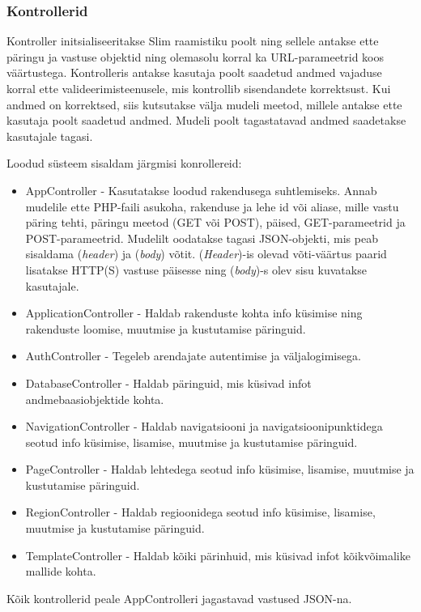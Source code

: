 \documentclass[a4paper,12pt]{article} %
\begin{document}
\subsubsection{Kontrollerid}
Kontroller initsialiseeritakse Slim raamistiku poolt ning sellele antakse ette päringu ja vastuse objektid ning olemasolu korral ka URL-parameetrid koos väärtustega. Kontrolleris antakse kasutaja poolt saadetud andmed vajaduse korral ette valideerimisteenusele, mis kontrollib sisendandete korrektsust. Kui andmed on korrektsed, siis kutsutakse välja mudeli meetod, millele antakse ette kasutaja poolt saadetud andmed. Mudeli poolt tagastatavad andmed saadetakse kasutajale tagasi.\par
Loodud süsteem sisaldam järgmisi konrollereid:
\begin{itemize}
\item AppController - Kasutatakse loodud rakendusega suhtlemiseks. Annab mudelile ette PHP-faili asukoha, rakenduse ja lehe id või aliase, mille vastu päring tehti, päringu meetod (GET või POST), päised, GET-parameetrid ja POST-parameetrid. Mudelilt oodatakse tagasi JSON-objekti, mis peab sisaldama (\textit{header}) ja (\textit{body}) võtit. (\textit{Header})-is olevad võti-väärtus paarid lisatakse HTTP(S) vastuse päisesse ning (\textit{body})-s olev sisu kuvatakse kasutajale.
\item ApplicationController - Haldab rakenduste kohta info küsimise ning rakenduste loomise, muutmise ja kustutamise päringuid.
\item AuthController - Tegeleb arendajate autentimise ja väljalogimisega.
\item DatabaseController - Haldab päringuid, mis küsivad infot andmebaasiobjektide kohta.
\item NavigationController - Haldab navigatsiooni ja navigatsioonipunktidega seotud info küsimise, lisamise, muutmise ja kustutamise päringuid.
\item PageController - Haldab lehtedega seotud info küsimise, lisamise, muutmise ja kustutamise päringuid.
\item RegionController - Haldab regioonidega seotud info küsimise, lisamise, muutmise ja kustutamise päringuid.
\item TemplateController - Haldab kõiki pärinhuid, mis küsivad infot kõikvõimalike mallide kohta.
\end{itemize}
Kõik kontrollerid peale AppControlleri jagastavad vastused JSON-na.
\end{document}
